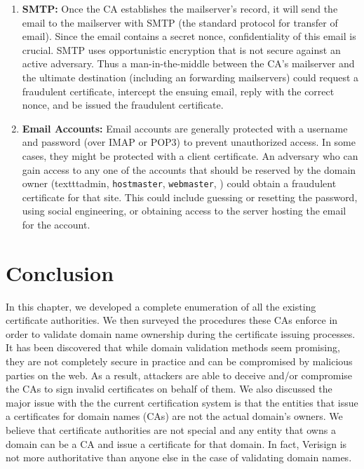 \begin{enumerate}
\item \textbf{SMTP:} Once the CA establishes the mailserver's record, it will send the email to the mailserver with SMTP (the standard protocol for transfer of email). Since the email contains a secret nonce, confidentiality of this email is crucial. SMTP uses opportunistic encryption that is not secure against an active adversary. Thus a man-in-the-middle between the CA's mailserver and the ultimate destination (including an forwarding mailservers) could request a fraudulent certificate, intercept the ensuing email, reply with the correct nonce, and be issued the fraud\-ulent certificate.

\item \textbf{Email Accounts:} Email accounts are generally protected with a username and password (over IMAP or POP3) to prevent unauthorized access. In some cases, they might be protected with a client certificate. An adversary who can gain access to any one of the accounts that should be reserved by the domain owner (\eg texttt{admin}, \texttt{hostmaster}, \texttt{webmaster}, \etc) could obtain a fraudulent certificate for that site. This could include guessing or resetting the password, using social engineering, or obtaining access to the server hosting the email for the account. 

\end{enumerate} 


\section{Conclusion}

In this chapter, we developed a complete enumeration of all the existing certificate authorities. We then surveyed the procedures these CAs enforce in order to validate domain name ownership during the certificate issuing processes. It has been discovered that while domain validation methods seem promising, they are not completely secure in practice and can be compromised by malicious parties on the web. As a result, attackers are able to deceive and/or compromise the CAs to sign invalid certificates on behalf of them. We also discussed the major issue with the the current certification system is that the entities that issue a certificates for domain names (CAs) are not the actual domain's owners. We believe that certificate authorities are not special and any entity that owns a domain can be a CA and issue a certificate for that domain. In fact, Verisign is not more authoritative than anyone else in the case of validating domain names. 

